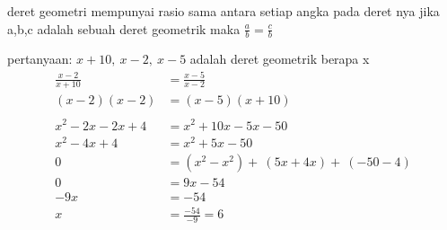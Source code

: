 \documentclass{article}
\begin{document}
\maketitle

\par\large deret geometri mempunyai rasio sama antara setiap angka pada deret nya jika a,b,c adalah sebuah deret geometrik  maka $\frac{a}{b} = \frac{c}{b}$
\par\large pertanyaan: $x+10,\ x-2,\ x-5$  adalah deret geometrik berapa x
$$
\begin{aligned}
\frac{x-2}{x+10} &= \frac{x-5}{x-2} \\
(x-2)(x-2) &= (x-5)(x+10) \\
\\
 x^2-2x-2x+4 &= x^2+10x-5x-50 \\
 x^2-4x+4 &= x^2+5x-50 \\
 0 &= (x^2-x^2)+\ (5x+4x)+\ (-50-4) \\
 0 &= 9x-54 \\
 -9x &= -54 \\
 x &= \frac{-54}{-9} = 6 \\
\end{aligned}
$$
\end{document}
